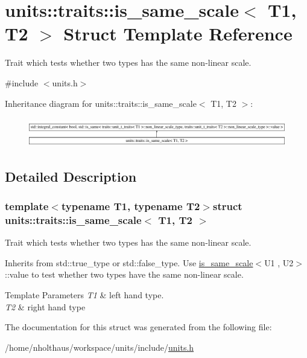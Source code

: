 \hypertarget{structunits_1_1traits_1_1is__same__scale}{}\section{units\+:\+:traits\+:\+:is\+\_\+same\+\_\+scale$<$ T1, T2 $>$ Struct Template Reference}
\label{structunits_1_1traits_1_1is__same__scale}


Trait which tests whether two types has the same non-\/linear scale.  




{\ttfamily \#include $<$units.\+h$>$}

Inheritance diagram for units\+:\+:traits\+:\+:is\+\_\+same\+\_\+scale$<$ T1, T2 $>$\+:\begin{figure}[H]
\begin{center}
\leavevmode
\includegraphics[height=1.287356cm]{structunits_1_1traits_1_1is__same__scale}
\end{center}
\end{figure}


\subsection{Detailed Description}
\subsubsection*{template$<$typename T1, typename T2$>$struct units\+::traits\+::is\+\_\+same\+\_\+scale$<$ T1, T2 $>$}

Trait which tests whether two types has the same non-\/linear scale. 

Inherits from {\ttfamily std\+::true\+\_\+type} or {\ttfamily std\+::false\+\_\+type}. Use {\ttfamily \hyperlink{structunits_1_1traits_1_1is__same__scale}{is\+\_\+same\+\_\+scale}$<$U1 , U2$>$\+::value} to test whether two types have the same non-\/linear scale. 
\begin{DoxyTemplParams}{Template Parameters}
{\em T1} & left hand type. \\
\hline
{\em T2} & right hand type \\
\hline
\end{DoxyTemplParams}


The documentation for this struct was generated from the following file\+:\begin{DoxyCompactItemize}
\item 
/home/nholthaus/workspace/units/include/\hyperlink{units_8h}{units.\+h}\end{DoxyCompactItemize}
